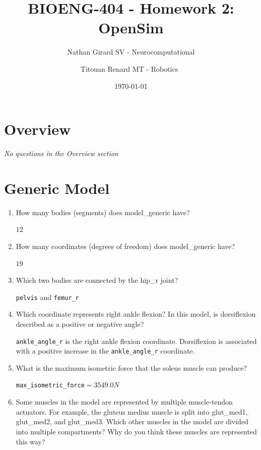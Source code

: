 \documentclass[11pt]{article}
\title{BIOENG-404 - Homework 2: OpenSim}
\author{
    Nathan Girard
        SV - Neurocomputational
        \and
    Titouan Renard
            MT - Robotics 
}
\date{\today}
\begin{document}
\maketitle

\section{Overview}
\begin{adjustwidth}{0.5cm}{}
    \textit{No questions in the Overview section}
\end{adjustwidth}
\section{Generic Model}

\begin{enumerate}
    \item How many bodies (segments) does model\_generic have?
    \begin{adjustwidth}{0.5cm}{}
        $12$
    \end{adjustwidth}
    \item How many coordinates (degrees of freedom) does model\_generic have?
    \begin{adjustwidth}{0.5cm}{}
        $19$
    \end{adjustwidth}
    \item Which two bodies are connected by the hip\_r joint?
    \begin{adjustwidth}{0.5cm}{}
        \texttt{pelvis} and \texttt{femur\_r}
    \end{adjustwidth}
    \item Which coordinate represents right ankle flexion? In this model, is dorsiflexion described as a positive or negative angle?
    \begin{adjustwidth}{0.5cm}{}
        \texttt{ankle\_angle\_r} is the right ankle flexion coordinate. Dorsiflexion is associated with a positive increase in the \texttt{ankle\_angle\_r} coordinate.
    \end{adjustwidth}
    \item What is the maximum isometric force that the soleus muscle can produce?
    \begin{adjustwidth}{0.5cm}{}
        \texttt{max\_isometric\_force}$=3549.0N$
    \end{adjustwidth}
    \item Some muscles in the model are represented by multiple muscle-tendon actuators. For example, the gluteus medius muscle is split into glut\_med1, glut\_med2, and glut\_med3. Which other muscles in the model are divided into multiple compartments? Why do you think these muscles are represented this way?

\end{enumerate}
\end{document}
